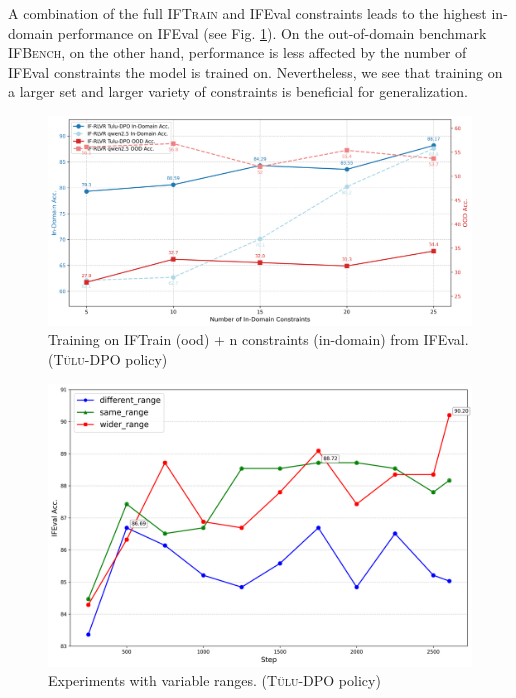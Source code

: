 \documentclass{article}
\newcommand{\benchname}{\textsc{IFBench}\xspace}
\newcommand{\trainname}{\textsc{IFTrain}\xspace}
\newcommand{\tulu}{\textsc{T\"ulu}\xspace}
\begin{document}
A combination of the full \trainname and IFEval constraints leads to the highest in-domain performance on IFEval (see Fig. \ref{fig:indomainconstraints}). On the out-of-domain benchmark \benchname, on the other hand, performance is less affected by the number of IFEval constraints the model is trained on. Nevertheless, we see that training on a larger set and larger variety of constraints is beneficial for generalization.

\begin{figure}
    \centering
    \includegraphics[width=0.8\linewidth]{figures/comparison_performance_graph.png}
    \caption{Training on IFTrain (ood) + n constraints (in-domain) from IFEval. (\tulu-DPO policy) }
    \label{fig:indomainconstraints}
\end{figure}


\begin{figure}
  \begin{center}
    \centering
    \includegraphics[width=\linewidth]{figures/variable_ranges.png}
        \caption{Experiments with variable ranges. (\tulu-DPO policy)}
          \label{fig:var_range}
\end{center}
\end{figure}
\end{document}
